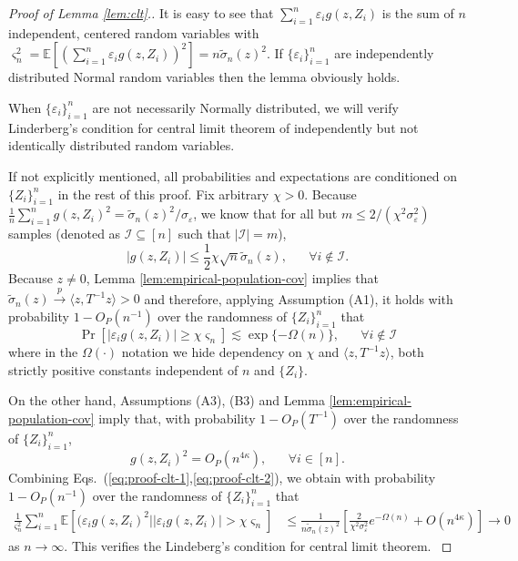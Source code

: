 \documentclass[11pt,a4paper]{article}
\renewcommand{\tilde}{\widetilde}
\theoremstyle{definition}
\theoremstyle{plain}
\theoremstyle{remark}
\newcommand{\mI}{\mathcal I}
\begin{document}
\begin{proof}[Proof of Lemma \ref{lem:clt}.]
It is easy to see that $\sum_{i=1}^n\varepsilon_i g(z,Z_i)$ is the sum of $n$ independent, centered random variables with $\varsigma_n^2 = \mathbb E[(\sum_{i=1}^n\varepsilon_ig(z,Z_i))^2] = n\tilde\sigma_n(z)^2$.
If $\{\varepsilon_i\}_{i=1}^n$ are independently distributed Normal random variables then the lemma obviously holds.

When $\{\varepsilon_i\}_{i=1}^n$ are not necessarily Normally distributed, 
we will verify Linderberg's condition for central limit theorem of independently but not identically distributed random variables.

If not explicitly mentioned, all probabilities and expectations are conditioned on $\{Z_i\}_{i=1}^n$ in the rest of this proof.
Fix arbitrary $\chi>0$. Because $\frac{1}{n}\sum_{i=1}^ng(z,Z_i)^2 = \tilde\sigma_n(z)^2/\sigma_\varepsilon$,
we know that for all but $m\leq 2/(\chi^2\sigma_\varepsilon^2)$ samples (denoted as $\mI\subseteq[n]$ such that $|\mI|=m$), 
$$
\big|g(z,Z_i)\big| \leq \frac{1}{2}\chi \sqrt{n}\tilde\sigma_n(z),\;\;\;\;\;\;\forall i\notin\mI.
$$
Because $z\neq 0$, Lemma \ref{lem:empirical-population-cov} implies that $\tilde\sigma_n(z)\overset{p}{\to} \langle z, T^{-1} z\rangle >0$ and therefore, applying Assumption (A1), it holds 
with probability $1-O_P(n^{-1})$ over the randomness of $\{Z_i\}_{i=1}^n$ that
\begin{equation}
\Pr\left[\big|\varepsilon_i g(z,Z_i)\big| \geq \chi \varsigma_n\right] \lesssim \exp\{-\Omega(n)\},\;\;\;\;\;\;\forall i\notin \mI
\label{eq:proof-clt-1}
\end{equation}
where in the $\Omega(\cdot)$ notation we hide dependency on $\chi$ and $\langle z,T^{-1}z\rangle$, both strictly positive constants independent of $n$ and $\{Z_i\}$.

{\color{red}
On the other hand, Assumptions (A3), (B3) and Lemma \ref{lem:empirical-population-cov} imply that, with probability $1-O_P(T^{-1})$ over the randomness of $\{Z_i\}_{i=1}^n$, 
\begin{equation}
g(z,Z_i)^2 = O_P(n^{4\kappa}),\;\;\;\;\;\;\forall i\in[n].
\label{eq:proof-clt-2}
\end{equation}
Combining Eqs.~(\ref{eq:proof-clt-1},\ref{eq:proof-clt-2}), we obtain with probability $1-O_P(n^{-1})$ over the randomness of $\{Z_i\}_{i=1}^n$ that
\begin{align*}
\frac{1}{\varsigma_n^2}\sum_{i=1}^n \mathbb E\left[(\varepsilon_ig(z,Z_i)^2\big| |\varepsilon_ig(z,Z_i)|>\chi\varsigma_n\right] &\leq \frac{1}{n\tilde\sigma_n(z)^2}\left[\frac{2}{\chi^2\sigma_\varepsilon^2}e^{-\Omega(n)} + O(n^{4\kappa}) \right]\to 0
\end{align*}
as $n\to\infty$. This verifies the Lindeberg's condition for central limit theorem.
}
\end{proof}
\end{document}

